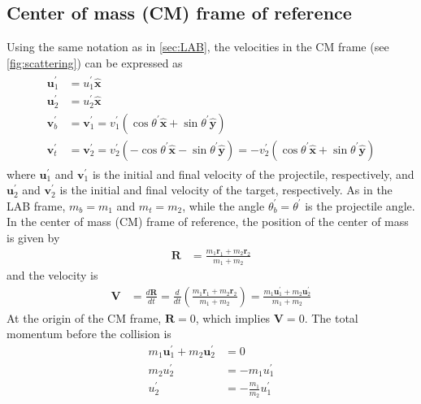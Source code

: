\documentclass[twoside,english]{uiofysmaster/uiofysmaster}
\let\orgautoref\autoref
\renewcommand{\autoref}
        {%
		 \def\sectionautorefname{Section}%
		 \def\subsectionautorefname{Section}%
		 \def\subsubsectionautorefname{Section}%
		 \def\chapterautorefname{Chapter}%
          \orgautoref}
\begin{document}
\begin{appendices}
\section{Center of mass (CM) frame of reference}\label{sec:CM}
Using the same notation as in \autoref{sec:LAB}, the velocities in the CM frame (see \autoref{fig:scattering}) can be expressed as
\begin{align}\label{eq:2p-CM-collision}
\begin{split}
	 \boldsymbol{u}_1^{'} &= u_1^{'} \boldsymbol{\hat{x}} \\
	 \boldsymbol{u}_2^{'} &= u_2^{'} \boldsymbol{\hat{x}} \\
	 \boldsymbol{v}_b^{'} &= \boldsymbol{v}_1^{'} = v_1^{'} (\cos \theta^{'} \boldsymbol{\hat{x}} + \sin \theta^{'} \boldsymbol{\hat{y}}) \\
	\boldsymbol{v}_t^{'} &= \boldsymbol{v}_2^{'} = v_2^{'} (-\cos \theta^{'} \boldsymbol{\hat{x}} - \sin \theta^{'} \boldsymbol{\hat{y}}) = -v_2^{'} (\cos \theta^{'} \boldsymbol{\hat{x}} + \sin \theta^{'} \boldsymbol{\hat{y}})
\end{split}
\end{align}
where $\boldsymbol{u}_1^{'}$ and $\boldsymbol{v}_1^{'}$ is the initial and final velocity of the projectile, respectively, and $\boldsymbol{u}_2^{'}$ and $\boldsymbol{v}_2^{'}$ is the initial and final velocity of the target, respectively. 
As in the LAB frame, $m_b = m_1$ and $m_t = m_2$, while the angle $\theta_b^{'} = \theta^{'}$ is the projectile angle. 
In the center of mass (CM) frame of reference, the position of the center of mass is given by
\begin{align}\label{eq:CMpos}
	\boldsymbol{R} &= \frac{m_1 \boldsymbol{r}_1 + m_2 \boldsymbol{r}_2}{m_1 + m_2}
\end{align}
and the velocity is
\begin{align}\label{eq:Vcm}
	\boldsymbol{V} &= \frac{d\boldsymbol{R}}{dt}
	= \frac{d}{dt} \left( \frac{m_1 \boldsymbol{r}_1 + m_2 \boldsymbol{r}_2}{m_1 + m_2} \right)
	= \frac{m_1 \boldsymbol{u}_1^{'} + m_2 \boldsymbol{u}_2^{'}}{m_1 + m_2}
\end{align}
At the origin of the CM frame, $\boldsymbol{R} = 0$, which implies $\boldsymbol{V} = 0$. 
The total momentum before the collision is
\begin{align}\label{eq:ucm}
	m_1 \boldsymbol{u}_1^{'} + m_2 \boldsymbol{u}_2^{'} &= 0  \nonumber\\
	m_2 u_2^{'} &= -m_1 u_1^{'} \nonumber\\
	u_2^{'} &= - \frac{m_1}{m_2} u_1^{'} \nonumber\\

\end{align}
\end{appendices}
\end{document}
